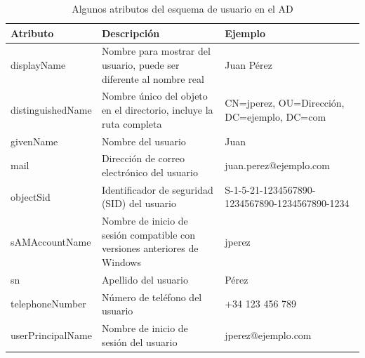 \begin{longtable}{|l|p{5cm}|p{5cm}|}
    \caption{Algunos atributos del esquema de usuario en el AD}
    \label{table:ad-user-schema-attributes}                                                                                                        \\
    \hline
    \textbf{Atributo} & \textbf{Descripción}                                                      & \textbf{Ejemplo}                               \\
    \hline
    \endfirsthead
    \hline
    displayName       & Nombre para mostrar del usuario, puede ser diferente al nombre real       & Juan Pérez                                     \\
    \hline
    distinguishedName & Nombre único del objeto en el directorio, incluye la ruta completa        & CN=jperez, OU=Dirección, DC=ejemplo, DC=com    \\
    \hline
    givenName         & Nombre del usuario                                                        & Juan                                           \\
    \hline
    mail              & Dirección de correo electrónico del usuario                               & juan.perez@ejemplo.com                         \\
    \hline
    objectSid         & Identificador de seguridad (SID) del usuario                              & S-1-5-21-1234567890-1234567890-1234567890-1234 \\
    \hline
    sAMAccountName    & Nombre de inicio de sesión compatible con versiones anteriores de Windows & jperez                                         \\
    \hline
    sn                & Apellido del usuario                                                      & Pérez                                          \\
    \hline
    telephoneNumber   & Número de teléfono del usuario                                            & +34 123 456 789                                \\
    \hline
    userPrincipalName & Nombre de inicio de sesión del usuario                                    & jperez@ejemplo.com                             \\
    \hline
\end{longtable}
